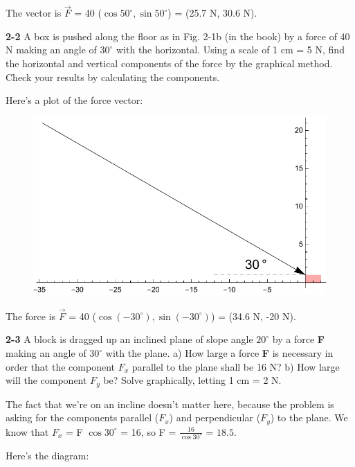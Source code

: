 \documentclass{amsart}
\begin{document}
The vector is $\vec F$ = 40 ($\cos 50^\circ,\sin 50^\circ$) = (25.7 N, 30.6 N).
\clearpage

\noindent
\textbf{2-2} A box is pushed along the floor as in Fig. 2-1b (in the book) by a force
of 40 N making an angle of $30^\circ$ with the horizontal.
Using a scale of 1 cm = 5 N, find the horizontal and vertical components of the force by the graphical
method.
Check your results by calculating the components.

Here's a plot of the force vector:

\begin{figure}[h]
\includegraphics[scale=0.4]{2-2}
\end{figure}

The force is $\vec F$ = 40 ($\cos (-30^\circ), \sin (-30^\circ)$) = (34.6 N, -20 N).

\vspace{\baselineskip}

\noindent
\textbf{2-3} A block is dragged up an inclined plane of slope angle $20^\circ$
by a force \textbf{F} making an angle of $30^\circ$ with the plane.\newline
a) How large a force \textbf{F} is necessary in order that the component $F_x$
parallel to the plane shall be 16 N?\newline
b) How large will the component $F_y$ be? Solve graphically, letting 1 cm = 2 N.

The fact that we're on an incline doesn't matter here, because the problem is asking
for the components parallel ($F_x$) and perpendicular ($F_y$) to the plane.
We know that $F_x$ = F $\cos 30^\circ$ = 16, so F = $\frac{16}{\cos 30^\circ}$ = $18.5$.

Here's the diagram:
\end{document}
